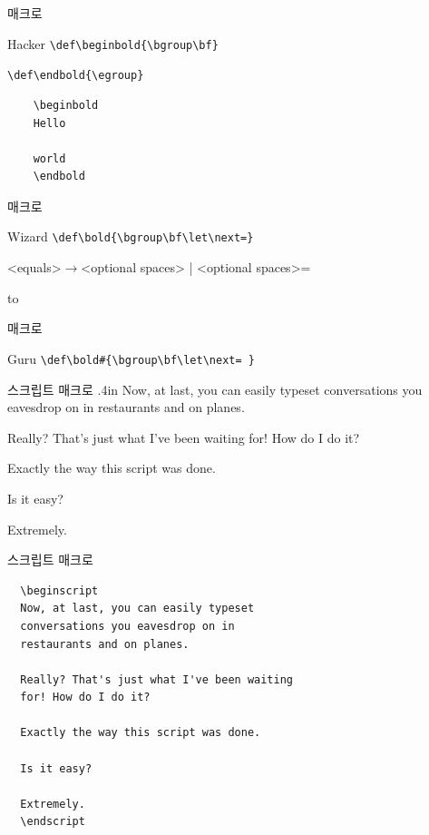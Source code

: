 \documentclass{beamer}
\begin{document}
%
\begin{frame}[fragile]{\texttt{\string\bold} 매크로}
  \begin{alertblock}{Hacker}
    \verb+\def\beginbold{\bgroup\bf}+
    
    \verb+\def\endbold{\egroup}+
  \end{alertblock}

  \begin{verbatim}
    \beginbold
    Hello

    world
    \endbold
  \end{verbatim}
\end{frame}


%
\begin{frame}[fragile]{\texttt{\string\bold} 매크로}
  \begin{alertblock}{Wizard}
    \verb+\def\bold{\bgroup\bf\let\next=}+
  \end{alertblock}
  \medskip
  <equals>$\rightarrow$<optional spaces> | <optional spaces>=
  
  \hbox to
  \medskip
\end{frame}


%
\begin{frame}[fragile]{\texttt{\string\bold} 매크로}
  \begin{alertblock}{Guru}
    \verb+\def\bold#{\bgroup\bf\let\next= }+
  \end{alertblock}
\end{frame}


%
\newcount\spk
\def\beginscript{\bgroup \parindent=0pt \rm \spk=1 \rightskip.4in
  \def\par{\ifnum\spk=1 \endgraf \sl \spk=2 \leftskip.4in \rightskip0in
    \else \endgraf \rm \spk=1 \leftskip0in \rightskip.4in \fi}}
\def\endscript {\egroup}

\begin{frame}[fragile]{스크립트 매크로}
  \hsize 3in
  \beginscript
  Now, at last, you can easily typeset
  conversations you eavesdrop on in
  restaurants and on planes.
  
  Really? That's just what I've been waiting
  for! How do I do it?
  
  Exactly the way this script was done.
  
  Is it easy?
  
  Extremely.
  \endscript
\end{frame}


%
\begin{frame}[fragile]{스크립트 매크로}
  \begin{verbatim}
  \beginscript
  Now, at last, you can easily typeset
  conversations you eavesdrop on in
  restaurants and on planes.
  
  Really? That's just what I've been waiting
  for! How do I do it?
  
  Exactly the way this script was done.
  
  Is it easy?
  
  Extremely.
  \endscript
  \end{verbatim}
\end{frame}
\end{document}
